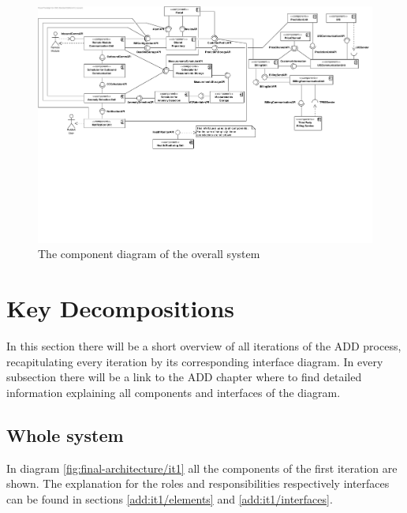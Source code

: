 \begin{figure}
	\begin{centering}
		\includegraphics[width=1.42\textwidth,angle=90]{figs/final-component.pdf}
		\caption{The component diagram of the overall system}
		\label{fig:final-components}
	\end{centering}
\end{figure}

\section{Key Decompositions}

\npar In this section there will be a short overview of all iterations of the
ADD process, recapitulating every iteration by its corresponding interface
diagram. In every subsection there will be a link to the ADD chapter where to
find detailed information explaining all components and interfaces of the
diagram.

\subsection{Whole system}

\npar In diagram \ref{fig:final-architecture/it1} all the components of the
first iteration are shown. The explanation for the roles and responsibilities
respectively interfaces can be found in sections \ref{add:it1/elements} and
\ref{add:it1/interfaces}.


